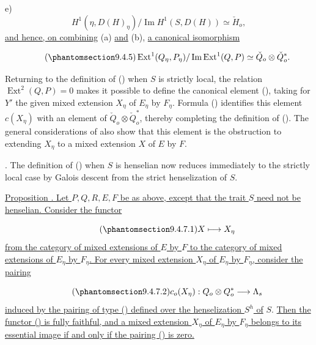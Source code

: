 \noindent
e)
\begin{equation*}
H^1(\eta,D(H)_\eta)/\operatorname{Im}H^1(S,D(H))
\simeq\check H_o,
\end{equation*}
\underline{and hence, on combining} (a) \underline{and} (b), \underline{a canonical isomorphism}

\begin{equation}\tag{\SGARefTarget{sga7.sga7i.eix.n9-4-5}{9.4.5}}
\operatorname{Ext}^1(Q_\eta,P_\eta)/
\operatorname{Im}\operatorname{Ext}^1(Q,P)
\simeq\check Q_o\otimes\check Q_o^*.
\end{equation}

Returning to the definition of () when $S$ is strictly local, the
relation $\operatorname{Ext}^2(Q,P)=0$ makes it possible to define the
canonical element (), taking for $Y'$ the given mixed extension
$X_\eta$ of $E_\eta$ by $F_\eta$. Formula () identifies this element
$c(X_\eta)$ with an element of $\check Q_o\otimes\check Q_o^*$, thereby
completing the definition of (). The general considerations of 
also show that this element is the obstruction to extending $X_\eta$ to a
mixed extension $X$ of $E$ by $F$.

\medskip
\noindent
{}. The definition of () when $S$ is henselian now reduces
immediately to the strictly local case by Galois descent from the strict
henselization of $S$.

\medskip
\noindent
\underline{Proposition . Let $P,Q,R,E,F$ be as above, except that the
trait $S$ need not be henselian. Consider the functor}

\begin{equation}\tag{\SGARefTarget{sga7.sga7i.eix.n9-4-7-1}{9.4.7.1}}
X\longmapsto X_\eta
\end{equation}
\underline{from the category of mixed extensions of $E$ by $F$ to the
category of mixed extensions of $E_\eta$ by $F_\eta$. For every mixed
extension $X_\eta$ of $E_\eta$ by $F_\eta$, consider the pairing}

\begin{equation}\tag{\SGARefTarget{sga7.sga7i.eix.n9-4-7-2}{9.4.7.2}}
c_o(X_\eta):Q_o\otimes Q_o^*\longrightarrow\Lambda_s
\end{equation}
\underline{induced by the pairing of type () defined over the
henselization $S^h$ of} $S$. \underline{Then the functor () is fully faithful,
and a mixed extension $X_\eta$ of $E_\eta$ by $F_\eta$ belongs to its
essential image if and only if the pairing () is zero.}

